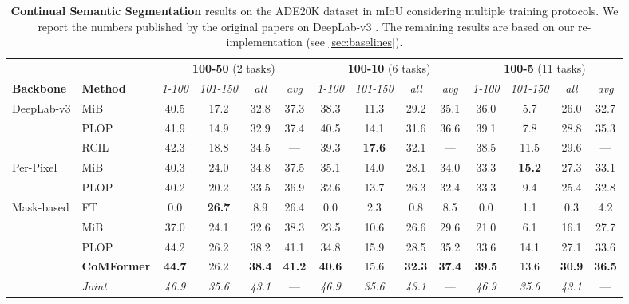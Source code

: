 \documentclass[10pt,twocolumn,letterpaper]{article}
\begin{document}
\begin{table*}[t]
\centering
\small
\setlength{\tabcolsep}{4pt} \begin{tabular}{ll|cccc|cccc|cccc}
\hline
\multicolumn{2}{c}{} & \multicolumn{4}{c}{{\textbf{100-50} (2 tasks)}} & \multicolumn{4}{c}{{\textbf{100-10} (6 tasks)}} & \multicolumn{4}{c}{{\textbf{100-5} (11 tasks)}} \\
\textbf{Backbone}   & \textbf{Method}       & \textit{1-100} & \textit{101-150} & \textit{all} & \textit{avg}  & \textit{1-100} & \textit{101-150}  & \textit{all} & \textit{avg} & \textit{1-100} & \textit{101-150}  & \textit{all} & \textit{avg}  \\ \hline
\multirow{3}{*}{DeepLab-v3 \cite{chen2017deeplabv3}} 
& MiB \cite{cermelli2020modelingthebackground}          & 40.5 & 17.2  &	32.8 & 37.3 & 38.3 &	11.3  & 29.2 &	35.1 & 36.0 &  5.7  & 26.0&	32.7 \\
& PLOP \cite{douillard2020plop}                         & 41.9 & 14.9  &	32.9 & 37.4  &40.5 &	14.1  & 31.6 &	36.6 & 39.1 &  7.8  & 28.8 &	35.3  \\
& RCIL \cite{zhang2022rcil}                             & 42.3 & 18.8   &	34.5 & --- &39.3 &	\textbf{17.6}  & 32.1 &---	  & 38.5 & 11.5   & 29.6 &	---  \\	 \hline
\multirow{2}{*}{Per-Pixel} & MiB          & 40.3 & 24.0  & 34.8 & 37.5  & 35.1 & 14.0  &	28.1 & 34.0 & 33.3 & \textbf{15.2}  &  27.3 & 33.1 \\ 
& PLOP        & 40.2 & 20.2  & 33.5  & 36.9 &  32.6 &	13.7  & 26.3 & 32.4 & 33.3 & 9.4  & 25.4 & 32.8\\ 
\hline
\multirow{5}{*}{Mask-based} & FT        &  0.0 & \textbf{26.7} &  8.9 & 26.4 &  0.0 &  2.3  &	 0.8 &	 8.5 &  0.0 &  1.1 &  0.3 &  4.2 \\
& MiB       & 37.0 & 24.1  &  32.6 & 38.3  & 23.5 & 10.6  &	26.6 &	29.6 & 21.0 &  6.1  & 16.1 & 27.7 \\
& PLOP     & 44.2 & 26.2  & 38.2 & 41.1  & 34.8 & 15.9  &	28.5 &	35.2 & 33.6 & 14.1  & 27.1 & 33.6 \\
& \textbf{CoMFormer}    & \textbf{44.7} & 26.2  & \textbf{38.4} & \textbf{41.2} &  \textbf{40.6} & 15.6  &	\textbf{32.3} &	\textbf{37.4} & \textbf{39.5} & 13.6  & \textbf{30.9} & \textbf{36.5} \\  \hdashline
& \textit{Joint}        & \textit{46.9} & \textit{35.6}   & \textit{43.1} & --- & \textit{46.9} & \textit{35.6}   & \textit{43.1} & --- & \textit{46.9} & \textit{35.6}   &	\textit{43.1} &	--- \\ 
\hline
\end{tabular}
\caption{\textbf{Continual Semantic Segmentation} results on the ADE20K dataset in mIoU considering multiple training protocols. We report the numbers published by the original papers on DeepLab-v3 \cite{chen2017deeplabv3}. The remaining results are based on our re-implementation (see \cref{sec:baselines}).}
\label{tab:ade_sem}
\vspace{-1em}
\end{table*}
\end{document}
